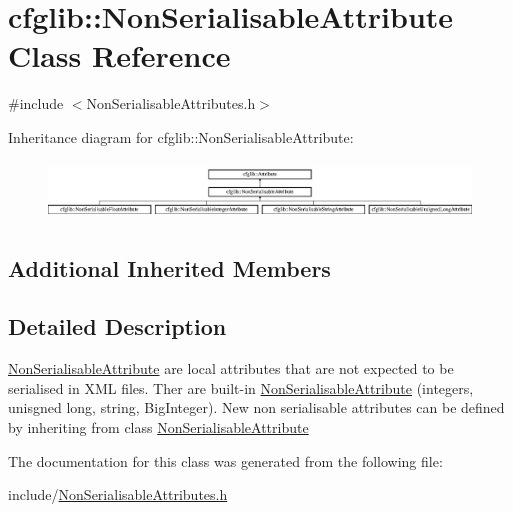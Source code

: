 \hypertarget{classcfglib_1_1NonSerialisableAttribute}{}\section{cfglib\+:\+:Non\+Serialisable\+Attribute Class Reference}
\label{classcfglib_1_1NonSerialisableAttribute}


{\ttfamily \#include $<$Non\+Serialisable\+Attributes.\+h$>$}

Inheritance diagram for cfglib\+:\+:Non\+Serialisable\+Attribute\+:\begin{figure}[H]
\begin{center}
\leavevmode
\includegraphics[height=1.538462cm]{classcfglib_1_1NonSerialisableAttribute}
\end{center}
\end{figure}
\subsection*{Additional Inherited Members}


\subsection{Detailed Description}
\hyperlink{classcfglib_1_1NonSerialisableAttribute}{Non\+Serialisable\+Attribute} are local attributes that are not expected to be serialised in X\+ML files. Ther are built-\/in \hyperlink{classcfglib_1_1NonSerialisableAttribute}{Non\+Serialisable\+Attribute} (integers, unisgned long, string, Big\+Integer). New non serialisable attributes can be defined by inheriting from class \hyperlink{classcfglib_1_1NonSerialisableAttribute}{Non\+Serialisable\+Attribute} 

The documentation for this class was generated from the following file\+:\begin{DoxyCompactItemize}
\item 
include/\hyperlink{NonSerialisableAttributes_8h}{Non\+Serialisable\+Attributes.\+h}\end{DoxyCompactItemize}
